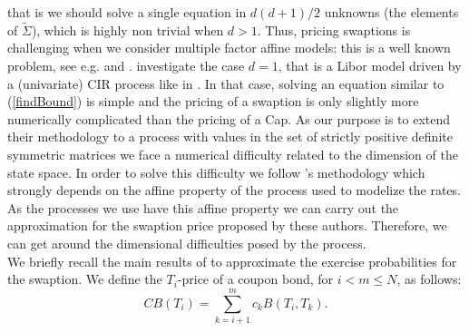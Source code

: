 that is we should solve a single equation in $d(d+1)/2$ unknowns (the elements of $\tilde{\Sigma}$), which is highly non trivial when $d>1$.  Thus, pricing swaptions is challenging when we consider multiple factor affine models: this is a well known problem, see e.g. \cite{article_Jam89} and  \cite{article_CollinDufresneGoldstein2002}. \cite{article_KRPT2009} investigate the case $d=1$, that is a Libor model driven by a (univariate) CIR process like in \cite{article_Jam87}. In that case, solving an  equation similar to (\ref{findBound}) is simple and the pricing of a swaption is only slightly more numerically complicated than the pricing of a Cap. As our purpose is to extend their methodology to a process with values in the set of strictly positive definite symmetric matrices we face a numerical difficulty related to the dimension of the state space. In order to solve this difficulty we follow   \cite{article_CollinDufresneGoldstein2002}'s methodology which strongly depends on the affine property of the process used to modelize the rates. As the processes we use have this affine property we can carry out the approximation for the swaption price proposed by these authors. Therefore, we can get around the dimensional difficulties posed by the process.\\




We briefly recall the main results of  \cite{article_CollinDufresneGoldstein2002} to approximate the exercise probabilities for the swaption.
We define the $T_{i}$-price of a coupon bond, for $i<m\leq N$, as follows:
\begin{equation}
CB(T_{i})=\sum_{k=i+1}^{m}{c_{k}B(T_{i},T_{k})}.
\end{equation}



